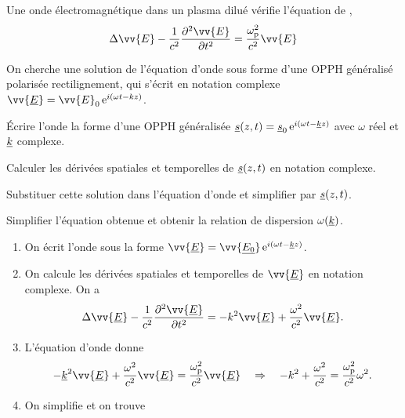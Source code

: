 \documentclass[12pt,fancy]{cours}
\begin{document}
\begin{theorem}\label{form:}
  Une onde électromagnétique dans un plasma dilué vérifie l’équation de ,
\begin{equation*}
\Delta\vv{E}-\frac{1}{c^2}\frac{\partial^2\vv{E}}{\partial t^2}=\frac{\omega_{\rm{p}}^2}{c^2}\vv{E}
\end{equation*}
\end{theorem}

On cherche une solution de l’équation d'onde sous forme d’une OPPH généralisé polarisée rectilignement, qui s’écrit en notation complexe $\vv{\underline{E}}=\vv{E}_0\,\e^{i(\omega t-kz)}$.
\begin{methode}
  \item	Écrire l'onde la forme d'une OPPH généralisée $\underline{s}(z,t)=\underline{s}_0 \,\mathrm{e}^{i(\omega t-\underline{k}z)}$ avec $\omega$ réel et $\underline{k}$ complexe.
  \item Calculer les dérivées spatiales et temporelles de $\underline{s}(z,t)$ en notation complexe.
  \item Substituer cette solution dans l'équation d'onde et simplifier par $\underline{s}(z,t)$.
  \item Simplifier l'équation obtenue et obtenir la relation de dispersion $\omega(\underline{k})$.
\end{methode}
\begin{enumerate}
  \item On écrit l'onde sous la forme $\vv{\underline{E}}=\vv{\underline{E_0}}\,\e^{i(\omega t-\udl{k}z)}$.
  \item On calcule les dérivées spatiales et temporelles de $\vv{\underline{E}}$ en notation complexe. On a 
  \begin{equation}
  \Delta\vv{\underline{E}}-\frac{1}{c^2}\frac{\partial^2\vv{\underline{E}}}{\partial t^2}=-k^2\vv{\underline{E}}+\frac{\omega^2}{c^2}\vv{\underline{E}}.
\end{equation}
    \item L'équation d'onde donne 
    \begin{equation}
      -\udl{k}^2\vv{\underline{E}}+\frac{\omega^2}{c^2}\vv{\underline{E}} =\frac{\omega_{\rm{p}}^2}{c^2}\vv{\underline{E}} \Rar  -k^2+\frac{\omega^2}{c^2} =\frac{\omega_{\rm{p}}^2}{c^2} \omega^2.
    \end{equation}
    \item On simplifie et on trouve 
\end{enumerate}
\end{document}

